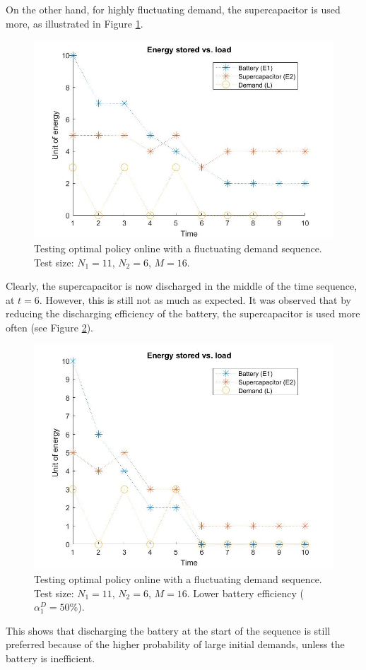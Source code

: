 \documentclass[conference]{IEEEtran}
\begin{document}
On the other hand, for highly fluctuating demand, the supercapacitor is used more, as illustrated in Figure \ref{fig:FluctuatingDemand}.
\begin{figure}[htbp]
\centerline{\includegraphics[scale=0.25]{EnergyStoredvsFluctuatingLoad(E1=10,E2=5).jpg}}
\caption{Testing optimal policy online with a fluctuating demand sequence. Test size: $N_{1}=11$, $N_{2}=6$, $M=16$.}
\label{fig:FluctuatingDemand}
\end{figure} Clearly, the supercapacitor is now discharged in the middle of the time sequence, at $t=6$. However, this is still not as much as expected. It was observed that by reducing the discharging efficiency of the battery, the supercapacitor is used more often (see Figure \ref{fig:FluctuatingDemand_LowBattEff}).
\begin{figure}[tbp]
\centerline{\includegraphics[scale=0.25]{EnergyStoredvsFluctuatingLoad_LowBattEff(E1=10,E2=5).jpg}}
\caption{Testing optimal policy online with a fluctuating demand sequence. Test size: $N_{1}=11$, $N_{2}=6$, $M=16$. Lower battery efficiency ($\alpha_{1}^{D}=50\%$).}
\label{fig:FluctuatingDemand_LowBattEff}
\end{figure} This shows that discharging the battery at the start of the sequence is still preferred because of the higher probability of large initial demands, unless the battery is inefficient.
\end{document}
